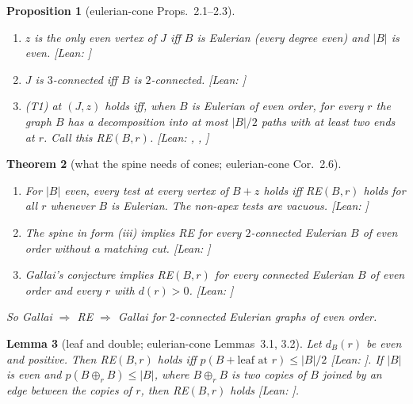 \documentclass[11pt]{amsart}
\newtheorem{theorem}{Theorem}[section]
\newtheorem{lemma}[theorem]{Lemma}
\newtheorem{proposition}[theorem]{Proposition}
\theoremstyle{definition}
\newcommand{\st}[1]{\textsf{\small[#1]}}
\begin{document}
\begin{proposition}[eulerian-cone Props.~2.1--2.3]\label{prop:cone}
\leavevmode
\begin{enumerate}[label=(\alph*)]
\item $z$ is the only even vertex of $J$ iff $B$ is Eulerian (every degree even) and $|B|$ is even.
\st{Lean: }
\item $J$ is $3$-connected iff $B$ is $2$-connected. \st{Lean: }
\item (T1) at $(J,z)$ holds iff, when $B$ is Eulerian of even order, for every $r$ the graph $B$ has a
decomposition into at most $|B|/2$ paths with at least two ends at $r$. Call this RE$(B,r)$.
\st{Lean: , , \lean{RootedDecomp}}
\end{enumerate}
\end{proposition}

\begin{theorem}[what the spine needs of cones; eulerian-cone Cor.~2.6]\label{thm:conespine}
\leavevmode
\begin{enumerate}[label=(\alph*)]
\item For $|B|$ even, every test at every vertex of $B+z$ holds iff RE$(B,r)$ holds for all $r$ whenever
$B$ is Eulerian. The non-apex tests are vacuous. \st{Lean: }
\item The spine in form (iii) implies RE for every $2$-connected Eulerian $B$ of even order without a
matching cut. \st{Lean: }
\item Gallai's conjecture implies RE$(B,r)$ for every connected Eulerian $B$ of even order and every $r$
with $d(r)>0$. \st{Lean: }
\end{enumerate}
So Gallai $\Rightarrow$ RE $\Rightarrow$ Gallai for $2$-connected Eulerian graphs of even order.
\end{theorem}

\begin{lemma}[leaf and double; eulerian-cone Lemmas~3.1, 3.2]\label{lem:leafdbl}
Let $d_B(r)$ be even and positive. Then RE$(B,r)$ holds iff $p(B+\text{leaf at }r)\le|B|/2$
\st{Lean: }. If $|B|$ is even and $p(B\oplus_rB)\le|B|$, where
$B\oplus_rB$ is two copies of $B$ joined by an edge between the copies of $r$, then RE$(B,r)$ holds
\st{Lean: }.
\end{lemma}
\end{document}
